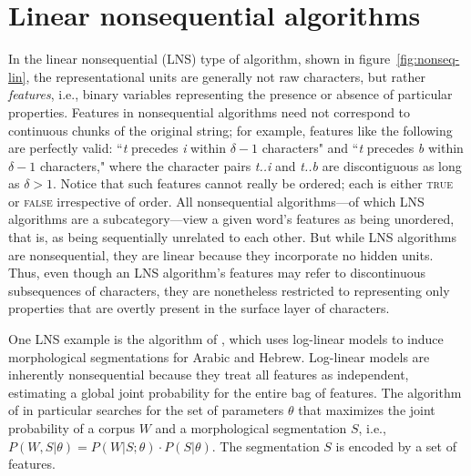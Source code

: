 \section{Linear nonsequential algorithms}
\label{subsec:nonseq-lin}
In the linear nonsequential (LNS) type of algorithm, shown in figure~\ref{fig:nonseq-lin}, the representational units are generally not raw characters, but rather \emph{features}, i.e., binary variables representing the presence or absence of particular properties.
Features in nonsequential algorithms need not correspond to continuous chunks of the original string; for example, features like the following are perfectly valid: ``\textit{t} precedes \textit{i} within $\delta-1$ characters" and ``\textit{t} precedes \textit{b} within $\delta-1$ characters," where the character pairs \emph{t..i} and \emph{t..b} are discontiguous as long as $\delta > 1$. Notice that such features cannot really be ordered; each is either \textsc{true} or \textsc{false} irrespective of order.
All nonsequential algorithms---of which LNS algorithms are a subcategory---view a given word's features as being unordered, that is, as being sequentially unrelated to each other. 
But while LNS algorithms are nonsequential, they are linear because they incorporate no hidden units. Thus, even though an LNS algorithm's features may refer to discontinuous subsequences of characters, they are nonetheless restricted to representing only properties that are overtly present in the surface layer of characters. 

One LNS example is the algorithm of \cite{poon-et-al:2009}, which uses log-linear models to induce morphological segmentations for Arabic and Hebrew. 
Log-linear models are inherently nonsequential because they treat all features as independent, estimating a global joint probability for the entire bag of features. 
The algorithm of \cite{poon-et-al:2009} in particular searches for the set of parameters $\theta$ that maximizes the joint probability of a corpus $W$ and a morphological segmentation $S$, i.e., $P(W,S| \theta) = P(W|S; \theta) \cdot P(S| \theta)$. The segmentation $S$ is encoded by a set of features.

